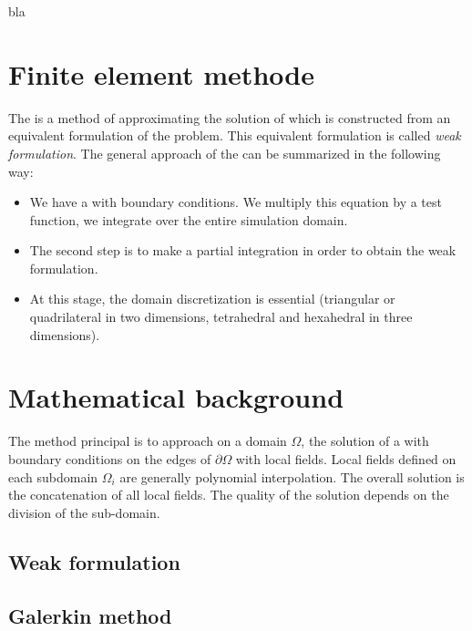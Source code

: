 bla

\newpage


\section{Finite element methode\label{FEM}}

The \FEM{} is a method of approximating the solution of \PED{} which is constructed from an equivalent formulation of the problem. This equivalent formulation is called {\it weak formulation}. The general approach of the \FEM{} can be summarized in the following way: 

\begin{itemize}
\item We have a \PED{} with boundary conditions. We multiply this equation by a test function, we integrate over the entire simulation domain.
\item The second step is to make a partial integration in order to obtain the weak formulation.
\item At this stage, the domain discretization is essential (triangular or quadrilateral in two dimensions, tetrahedral and hexahedral in three dimensions). 
\end{itemize}


\newpage


\section{Mathematical background}

The method principal is to approach on a domain $\Omega$, the solution of a \PED{} with boundary conditions on the edges of $\partial\Omega$ with local fields. Local fields defined on each subdomain $\Omega_{i}$ are generally polynomial interpolation. The overall solution is the concatenation of all local fields. The quality of the solution depends on the division of the sub-domain.

\subsection{Weak formulation}

\subsection{Galerkin method}

